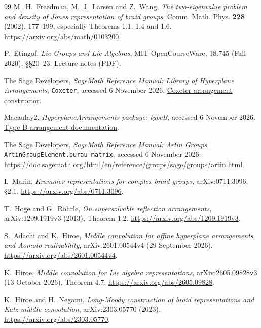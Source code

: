 \documentclass[11pt,a4paper]{article}
\theoremstyle{remark}\newtheorem{remark}[theorem]{Remark}
\begin{document}
\begin{thebibliography}{99}
M.~H.~Freedman, M.~J.~Larsen and Z.~Wang,
\emph{The two-eigenvalue problem and density of Jones representation
of braid groups}, Comm. Math. Phys. \textbf{228} (2002), 177--199,
especially Theorems 1.1, 1.4 and 1.6.
\url{https://arxiv.org/abs/math/0103200}.

P.~Etingof, \emph{Lie Groups and Lie Algebras}, MIT OpenCourseWare,
18.745 (Fall 2020), \S\S20--23.
\href{https://ocw.mit.edu/courses/18-745-lie-groups-and-lie-algebras-i-fall-2020/mit18_745_f20_lec_full.pdf}{Lecture notes (PDF)}.

The Sage Developers, \emph{SageMath Reference Manual: Library of
Hyperplane Arrangements}, \texttt{Coxeter}, accessed 6 November 2026.
\href{https://doc.sagemath.org/html/en/reference/discrete_geometry/sage/geometry/hyperplane_arrangement/library.html}{Coxeter arrangement constructor}.

Macaulay2, \emph{HyperplaneArrangements package: typeB},
accessed 6 November 2026.
\href{https://macaulay2.com/doc/Macaulay2/share/doc/Macaulay2/HyperplaneArrangements/html/_type__B_lp__Z__Z_cm__Ring_rp.html}{Type B arrangement documentation}.

\begingroup\raggedright
The Sage Developers, \emph{SageMath Reference Manual: Artin Groups},
\texttt{ArtinGroupElement.burau\_matrix}, accessed 6 November 2026.
\url{https://doc.sagemath.org/html/en/reference/groups/sage/groups/artin.html}.
\par\endgroup

I.~Marin, \emph{Krammer representations for complex braid groups},
arXiv:0711.3096, \S2.1.
\url{https://arxiv.org/abs/0711.3096}.

T.~Hoge and G.~R\"ohrle, \emph{On supersolvable reflection arrangements},
arXiv:1209.1919v3 (2013), Theorem 1.2.
\url{https://arxiv.org/abs/1209.1919v3}.

S.~Adachi and K.~Hiroe,
\emph{Middle convolution for affine hyperplane arrangements and Aomoto
realizability}, arXiv:2601.00544v4 (29 September 2026).
\url{https://arxiv.org/abs/2601.00544v4}.

K.~Hiroe, \emph{Middle convolution for Lie algebra representations},
arXiv:2605.09828v3 (13 October 2026), Theorem 4.7.
\url{https://arxiv.org/abs/2605.09828}.

K.~Hiroe and H.~Negami, \emph{Long-Moody construction of braid
representations and Katz middle convolution}, arXiv:2303.05770 (2023).
\url{https://arxiv.org/abs/2303.05770}.


\end{thebibliography}
\end{document}
